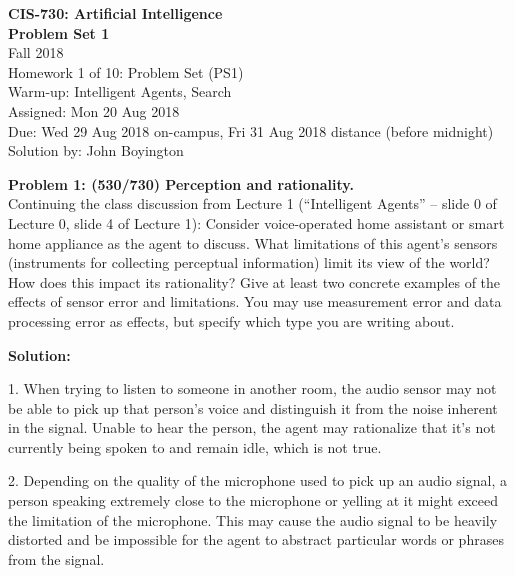 \documentclass{amsart}
\theoremstyle{definition}
\begin{document}
\noindent
\LARGE{\textbf{CIS-730: Artificial Intelligence}} \\
\large
\noindent
\textbf{Problem Set 1} \\
Fall 2018 \\
Homework 1 of 10: Problem Set (PS1) \\
Warm-up: Intelligent Agents, Search \\
Assigned: Mon 20 Aug 2018 \\
Due: Wed 29 Aug 2018 on-campus, Fri 31 Aug 2018 distance (before midnight) \\
Solution by:  John Boyington \\
\newline
\bigskip



\textbf{Problem 1: (530/730) Perception and rationality.} \\
Continuing the class discussion from Lecture 1 (“Intelligent Agents” – slide 0 of Lecture 0, slide 4 of Lecture 1):
Consider voice-operated home assistant or smart home appliance as the agent to discuss.
What limitations of this agent’s sensors (instruments for collecting perceptual information) limit its view of the world?
How does this impact its rationality? Give at least two concrete examples of the effects of sensor error and limitations.
You may use measurement error and data processing error as effects, but specify which type you are writing about.
\bigbreak

\textbf{Solution:}

1. When trying to listen to someone in another room, the audio sensor may not be able to pick up that person's voice and distinguish it from the noise inherent in the signal. Unable to hear the person, the agent may rationalize that it's not currently being spoken to and remain idle, which is not true.

2. Depending on the quality of the microphone used to pick up an audio signal, a person speaking extremely close to the microphone or yelling at it might exceed the limitation of the microphone. This may cause the audio signal to be heavily distorted and be impossible for the agent to abstract particular words or phrases from the signal.

\newpage
\end{document}
